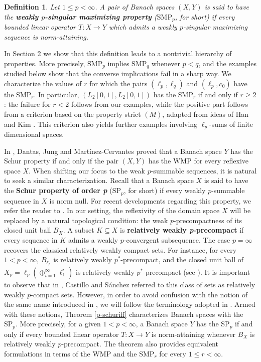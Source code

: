 \documentclass[12 pt]{article}%
\newtheorem{final remark}[theorem]{Final Remark}
\newtheorem{definition}[theorem]{Definition}
\newcommand{\corr}[2]{\textcolor{blue}{\st{#1} \textcolor{red} {#2}}}
\begin{document}


\begin{definition} Let $1 \leq p < \infty$. A pair of Banach spaces $(X, Y)$ is said to have the \textbf{weakly $p$-singular maximizing property} ($\mathrm{SMP}_p$, for short) if every bounded linear operator $T: X \to Y$ which admits a weakly $p$-singular maximizing sequence is norm-attaining.
\end{definition}


In Section 2 we show that this definition leads to a nontrivial hierarchy of properties. More precisely, $\mathrm{SMP}_p$ implies $\mathrm{SMP}_q$ whenever $p<q$, and the examples studied below show that the converse implications fail in a sharp way. We characterize the values of $r$ for which the pairs $(\ell_p,\ell_q)$ and $(\ell_p,c_0)$ have the $\mathrm{SMP}_r$. In particular, $(L_2[0,1],L_2[0,1])$ has the $\mathrm{SMP}_r$ if and only if $r\geq 2$: the failure for $r<2$ follows from our examples, while the positive part follows from a criterion based on the property strict $(M)$, adapted from ideas of Han and Kim \cite{han}. This criterion also yields further examples involving $\ell_p$-sums of finite dimensional spaces.

 In \cite{dantasjung}, Dantas, Jung and Martínez-Cervantes proved that a Banach space $Y$ has the Schur property if and only if the pair $(X, Y)$ has the $\mathrm{WMP}$ for every reflexive space $X$. When shifting our focus to the weak $p$-summable sequences, it is natural to seek a similar characterization. Recall that a Banach space $X$ is said to have the \textbf{Schur property of order \textit{p}} ($\mathrm{SP}_p$, for short) if every weakly $p$-summable sequence in $X$ is norm null. For recent developments regarding this property, we refer the reader to \cite{alikhani, P-Schur}. In our setting, the reflexivity of the domain space $X$ will be replaced by a natural topological condition: the weak $p$-precompactness of its closed unit ball $B_X$. A subset $K \subseteq X$ is \textbf{relatively weakly \textit{p}-precompact} if every sequence in $K$ admits a weakly $p$-convergent subsequence. The case $p=\infty$ recovers the classical relatively weakly compact sets. For instance, for every $1 < p < \infty$, $B_{\ell_p}$ is relatively weakly $p^*$-precompact, and the closed unit ball of $X_p = \ell_p(\oplus_{i=1}^\infty \ell_1^i)$ is relatively weakly $p^*$-precompact (see \cite{castillo, chenchavez}). It is important to observe that in \cite{castillo}, Castillo and Sánchez referred to this class of sets as relatively weakly $p$-compact sets. However, in order to avoid confusion with the notion of the same name introduced in \cite{sinhakarn}, we will follow the terminology adopted in \cite{chenchavez}. Armed with these notions, Theorem \ref{p-schuriff} characterizes Banach spaces with the $\mathrm{SP}_p$. More precisely, for a given $1<p<\infty$, a Banach space $Y$ has the $\mathrm{SP}_p$ if and only if every bounded linear operator $T:X\to Y$ is norm-attaining whenever $B_X$ is relatively weakly $p$-precompact. The theorem also provides equivalent formulations in terms of the $\mathrm{WMP}$ and the $\mathrm{SMP}_r$ for every $1\leq r<\infty$.
\end{document}
